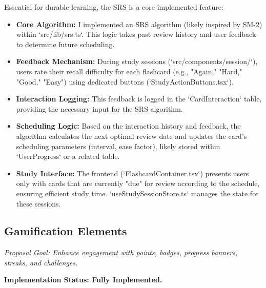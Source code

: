 \documentclass[
	letterpaper,
	11pt
]{jdf}
\begin{document}
Essential for durable learning, the SRS is a core implemented feature:
\begin{itemize}
    \item \textbf{Core Algorithm:} I implemented an SRS algorithm (likely inspired by SM-2) within `src/lib/srs.ts`. This logic takes past review history and user feedback to determine future scheduling.
    \item \textbf{Feedback Mechanism:} During study sessions (`src/components/session/`), users rate their recall difficulty for each flashcard (e.g., "Again," "Hard," "Good," "Easy") using dedicated buttons (`StudyActionButtons.tsx`).
    \item \textbf{Interaction Logging:} This feedback is logged in the `CardInteraction` table, providing the necessary input for the SRS algorithm.
    \item \textbf{Scheduling Logic:} Based on the interaction history and feedback, the algorithm calculates the next optimal review date and updates the card's scheduling parameters (interval, ease factor), likely stored within `UserProgress` or a related table.
    \item \textbf{Study Interface:} The frontend (`FlashcardContainer.tsx`) presents users only with cards that are currently "due" for review according to the schedule, ensuring efficient study time. `useStudySessionStore.ts` manages the state for these sessions.
\end{itemize}

\subsection{Gamification Elements}
\textit{Proposal Goal: Enhance engagement with points, badges, progress banners, streaks, and challenges.}

\textbf{Implementation Status: Fully Implemented.}
\end{document}
